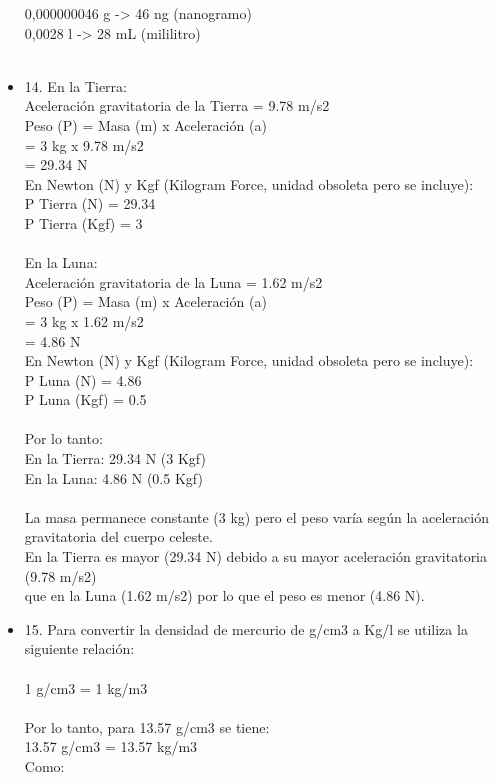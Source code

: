 \documentclass{article}
\begin{document}
\begin{itemize}
0,000000046 g -> 46 ng (nanogramo)\\
0,0028 l -> 28 mL (mililitro)\\
\\
\item{14.}
En la Tierra:\\
Aceleración gravitatoria de la Tierra = 9.78 m/s2\\
Peso (P) = Masa (m) x Aceleración (a)\\
= 3 kg x 9.78 m/s2\\
= 29.34 N\\
En Newton (N) y Kgf (Kilogram Force, unidad obsoleta pero se incluye):\\
P Tierra (N) = 29.34\\
P Tierra (Kgf) = 3\\
\\
En la Luna:\\
Aceleración gravitatoria de la Luna = 1.62 m/s2\\
Peso (P) = Masa (m) x Aceleración (a)\\
= 3 kg x 1.62 m/s2\\
= 4.86 N\\
En Newton (N) y Kgf (Kilogram Force, unidad obsoleta pero se incluye):\\
P Luna (N) = 4.86\\
P Luna (Kgf) = 0.5\\
\\
Por lo tanto:\\
En la Tierra: 29.34 N (3 Kgf)\\
En la Luna: 4.86 N (0.5 Kgf)\\
\\
La masa permanece constante (3 kg) pero el peso varía según la aceleración gravitatoria del cuerpo celeste.\\
En la Tierra es mayor (29.34 N) debido a su mayor aceleración gravitatoria (9.78 m/s2)\\
que en la Luna (1.62 m/s2) por lo que el peso es menor (4.86 N).\\
\item{15.}
Para convertir la densidad de mercurio de g/cm3 a Kg/l se utiliza la siguiente relación:\\
\\
1 g/cm3 = 1 kg/m3\\
\\
Por lo tanto, para 13.57 g/cm3 se tiene:\\
13.57 g/cm3 = 13.57 kg/m3\\
Como:\\

\end{itemize}
\end{document}
